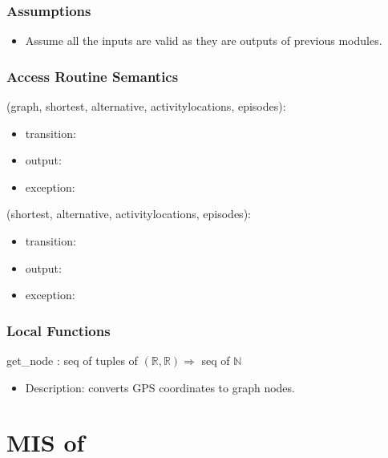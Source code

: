 \documentclass[12pt, titlepage]{article}
\begin{document}
\subsubsection{Assumptions}

\begin{itemize}
    \item Assume all the inputs are valid as they are outputs of previous modules. 
\end{itemize}

\subsubsection{Access Routine Semantics}

\noindent {}(graph, shortest, alternative, activitylocations, episodes):
\begin{itemize}
\item transition:  
\item output:  
\item exception:  
\end{itemize}

\noindent {}(shortest, alternative, activitylocations, episodes):
\begin{itemize}
\item transition:  
\item output:  
\item exception:  
\end{itemize}

\subsubsection{Local Functions}

get\_node : seq of tuples of $(\mathbb{R}, \mathbb{R}) \Rightarrow $ seq of $\mathbb{N}$
\begin{itemize}
    \item Description: converts GPS coordinates to graph nodes. 
\end{itemize}

\newpage

\section{MIS of } \label{Module}
\end{document}
